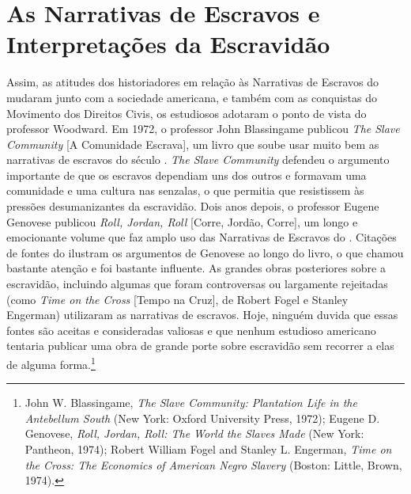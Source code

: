 \section{As Narrativas de Escravos e Interpretações da Escravidão}

Assim, as atitudes dos historiadores em relação às Narrativas de
Escravos do  mudaram junto com a sociedade americana, e também com as
conquistas do Movimento dos Direitos Civis, os estudiosos adotaram o
ponto de vista do professor Woodward. Em 1972, o professor John
Blassingame publicou \emph{The Slave Community} {[}A Comunidade
Escrava{]}, um livro que soube usar muito bem as narrativas de escravos
do século . \emph{The Slave Community} defendeu o argumento
importante de que os escravos dependiam uns dos outros e formavam uma
comunidade e uma cultura nas senzalas, o que permitia que resistissem às
pressões desumanizantes da escravidão. Dois anos depois, o professor
Eugene Genovese publicou \emph{Roll, Jordan, Roll} {[}Corre, Jordão,
Corre{]}, um longo e emocionante volume que faz amplo uso das Narrativas
de Escravos do . Citações de fontes do  ilustram os argumentos de
Genovese ao longo do livro, o que chamou bastante atenção e foi bastante
influente. As grandes obras posteriores sobre a escravidão, incluindo
algumas que foram controversas ou largamente rejeitadas (como \emph{Time
on the Cross} {[}Tempo na Cruz{]}, de Robert Fogel e Stanley Engerman)
utilizaram as narrativas de escravos. Hoje, ninguém duvida que essas
fontes são aceitas e consideradas valiosas e que nenhum estudioso
americano tentaria publicar uma obra de grande porte sobre escravidão
sem recorrer a elas de alguma forma.\footnote{John W. Blassingame,
  \emph{The Slave Community: Plantation Life in the Antebellum South}
  (New York: Oxford University Press, 1972); Eugene D. Genovese,
  \emph{Roll, Jordan, Roll: The World the Slaves Made} (New York:
  Pantheon, 1974); Robert William Fogel and Stanley L. Engerman,
  \emph{Time on the Cross: The Economics of American Negro Slavery}
  (Boston: Little, Brown, 1974).}

